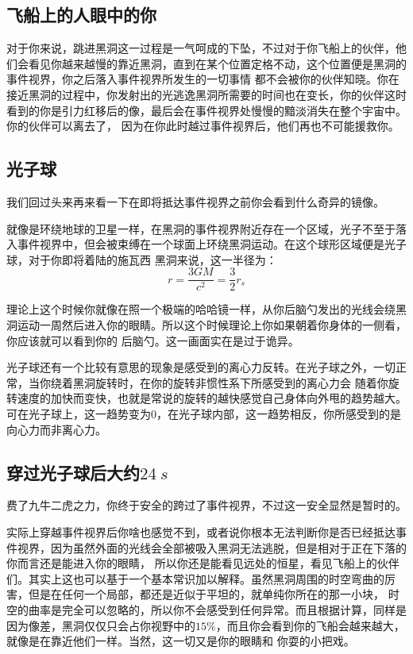 \documentclass{ctexart}
\begin{document}
    \subsection{飞船上的人眼中的你}
    对于你来说，跳进黑洞这一过程是一气呵成的下坠，不过对于你飞船上的伙伴，他们会看见你越来越慢的靠近黑洞，直到在某个位置定格不动，这个位置便是黑洞的事件视界，你之后落入事件视界所发生的一切事情
    都不会被你的伙伴知晓。你在接近黑洞的过程中，你发射出的光逃逸黑洞所需要的时间也在变长，你的伙伴这时看到的你是引力红移后的像，最后会在事件视界处慢慢的黯淡消失在整个宇宙中。你的伙伴可以离去了，
    因为在你此时越过事件视界后，他们再也不可能援救你。
    \subsection{光子球}
    我们回过头来再来看一下在即将抵达事件视界之前你会看到什么奇异的镜像。

    就像是环绕地球的卫星一样，在黑洞的事件视界附近存在一个区域，光子不至于落入事件视界中，但会被束缚在一个球面上环绕黑洞运动。在这个球形区域便是光子球，对于你即将着陆的施瓦西
    黑洞来说，这一半径为：
    \begin{equation}
        r=\frac{3GM}{c^2}=\frac{3}{2}r_s
    \end{equation}

    理论上这个时候你就像在照一个极端的哈哈镜一样，从你后脑勺发出的光线会绕黑洞运动一周然后进入你的眼睛。所以这个时候理论上你如果朝着你身体的一侧看，你应该就可以看到你的
    后脑勺。这一画面实在是过于诡异。

    光子球还有一个比较有意思的现象是感受到的离心力反转。\cite{abramowicz1990centrifugal}在光子球之外，一切正常，当你绕着黑洞旋转时，在你的旋转非惯性系下所感受到的离心力会
    随着你旋转速度的加快而变快，也就是常说的旋转的越快感觉自己身体向外甩的趋势越大。可在光子球上，这一趋势变为0，在光子球内部，这一趋势相反，你所感受到的是向心力而非离心力。
    \subsection{穿过光子球后大约$\SI[]{24}{s}$}
    费了九牛二虎之力，你终于安全的跨过了事件视界，不过这一安全显然是暂时的。

    实际上穿越事件视界后你啥也感觉不到，或者说你根本无法判断你是否已经抵达事件视界，因为虽然外面的光线会全部被吸入黑洞无法逃脱，但是相对于正在下落的你而言还是能进入你的眼睛，
    所以你还是能看见远处的恒星，看见飞船上的伙伴们。其实上这也可以基于一个基本常识加以解释。虽然黑洞周围的时空弯曲的厉害，但是在任何一个局部，都还是近似于平坦的，就单纯你所在的那一小块，
    时空的曲率是完全可以忽略的，所以你不会感受到任何异常。而且根据计算，同样是因为像差，黑洞仅仅只会占你视野中的$15\%$，而且你会看到你的飞船会越来越大，就像是在靠近他们一样。当然，这一切又是你的眼睛和
    你耍的小把戏。
\end{document}
